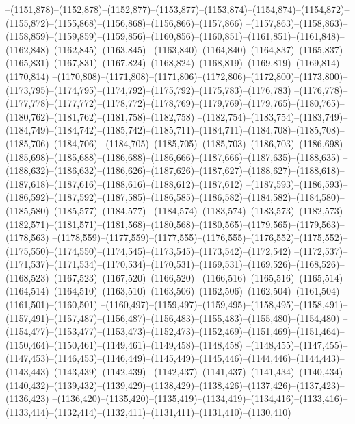 --(1151,878)--(1152,878)--(1152,877)--(1153,877)--(1153,874)--(1154,874)--(1154,872)--(1155,872)--(1155,868)--(1156,868)--(1156,866)--(1157,866)
--(1157,863)--(1158,863)--(1158,859)--(1159,859)--(1159,856)--(1160,856)--(1160,851)--(1161,851)--(1161,848)--(1162,848)--(1162,845)--(1163,845)
--(1163,840)--(1164,840)--(1164,837)--(1165,837)--(1165,831)--(1167,831)--(1167,824)--(1168,824)--(1168,819)--(1169,819)--(1169,814)--(1170,814)
--(1170,808)--(1171,808)--(1171,806)--(1172,806)--(1172,800)--(1173,800)--(1173,795)--(1174,795)--(1174,792)--(1175,792)--(1175,783)--(1176,783)
--(1176,778)--(1177,778)--(1177,772)--(1178,772)--(1178,769)--(1179,769)--(1179,765)--(1180,765)--(1180,762)--(1181,762)--(1181,758)--(1182,758)
--(1182,754)--(1183,754)--(1183,749)--(1184,749)--(1184,742)--(1185,742)--(1185,711)--(1184,711)--(1184,708)--(1185,708)--(1185,706)--(1184,706)
--(1184,705)--(1185,705)--(1185,703)--(1186,703)--(1186,698)--(1185,698)--(1185,688)--(1186,688)--(1186,666)--(1187,666)--(1187,635)--(1188,635)
--(1188,632)--(1186,632)--(1186,626)--(1187,626)--(1187,627)--(1188,627)--(1188,618)--(1187,618)--(1187,616)--(1188,616)--(1188,612)--(1187,612)
--(1187,593)--(1186,593)--(1186,592)--(1187,592)--(1187,585)--(1186,585)--(1186,582)--(1184,582)--(1184,580)--(1185,580)--(1185,577)--(1184,577)
--(1184,574)--(1183,574)--(1183,573)--(1182,573)--(1182,571)--(1181,571)--(1181,568)--(1180,568)--(1180,565)--(1179,565)--(1179,563)--(1178,563)
--(1178,559)--(1177,559)--(1177,555)--(1176,555)--(1176,552)--(1175,552)--(1175,550)--(1174,550)--(1174,545)--(1173,545)--(1173,542)--(1172,542)
--(1172,537)--(1171,537)--(1171,534)--(1170,534)--(1170,531)--(1169,531)--(1169,526)--(1168,526)--(1168,523)--(1167,523)--(1167,520)--(1166,520)
--(1166,516)--(1165,516)--(1165,514)--(1164,514)--(1164,510)--(1163,510)--(1163,506)--(1162,506)--(1162,504)--(1161,504)--(1161,501)--(1160,501)
--(1160,497)--(1159,497)--(1159,495)--(1158,495)--(1158,491)--(1157,491)--(1157,487)--(1156,487)--(1156,483)--(1155,483)--(1155,480)--(1154,480)
--(1154,477)--(1153,477)--(1153,473)--(1152,473)--(1152,469)--(1151,469)--(1151,464)--(1150,464)--(1150,461)--(1149,461)--(1149,458)--(1148,458)
--(1148,455)--(1147,455)--(1147,453)--(1146,453)--(1146,449)--(1145,449)--(1145,446)--(1144,446)--(1144,443)--(1143,443)--(1143,439)--(1142,439)
--(1142,437)--(1141,437)--(1141,434)--(1140,434)--(1140,432)--(1139,432)--(1139,429)--(1138,429)--(1138,426)--(1137,426)--(1137,423)--(1136,423)
--(1136,420)--(1135,420)--(1135,419)--(1134,419)--(1134,416)--(1133,416)--(1133,414)--(1132,414)--(1132,411)--(1131,411)--(1131,410)--(1130,410)
